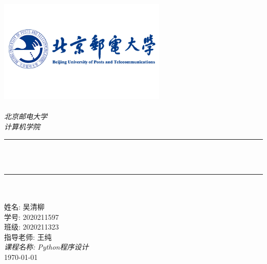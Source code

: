 \begin{titlepage}
	\newcommand{\HRule}{\rule{\linewidth}{0.5mm}}
	\includegraphics[width=8cm]{title/logo_bupt.png}\\[1cm]
	\center
	\quad\\[1.5cm]
	\textsl{\Large 北京邮电大学}\\[0.5cm]
	\textsl{\large  计算机学院}\\[0.5cm]
	\makeatletter
	\HRule \\[0.4cm]
	{\huge \bfseries \@title}\\[0.4cm]
	\HRule \\[0.5cm]
	~\\[1cm] %

	\makeatother
	{\large 姓名: 吴清柳}\\[0.5cm]
	{\large 学号: 2020211597}\\[0.5cm]
	{\large 班级: 2020211323}\\[0.5cm]
	{\large 指导老师: 王纯}\\[0.5cm]
	{\large \emph{课程名称: Python程序设计}}\\[0.5cm]
	{\large \today}\\[2cm]
	\vfill
\end{titlepage}
